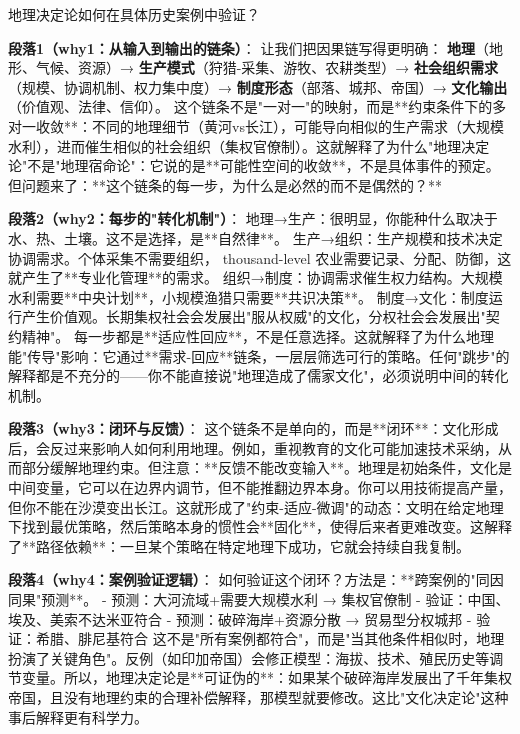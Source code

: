 \documentclass[openany, a4paper, 12pt]{book}
\begin{document}
	\begin{questionbox}
		地理决定论如何在具体历史案例中验证？
	\end{questionbox}
	
	\textbf{段落1（why1：从输入到输出的链条）}：  
	让我们把因果链写得更明确：  
	\textbf{地理}（地形、气候、资源）→ \textbf{生产模式}（狩猎-采集、游牧、农耕类型）→ \textbf{社会组织需求}（规模、协调机制、权力集中度）→ \textbf{制度形态}（部落、城邦、帝国）→ \textbf{文化输出}（价值观、法律、信仰）。  
	这个链条不是"一对一"的映射，而是**约束条件下的多对一收敛**：不同的地理细节（黄河vs长江），可能导向相似的生产需求（大规模水利），进而催生相似的社会组织（集权官僚制）。这就解释了为什么"地理决定论"不是"地理宿命论"：它说的是**可能性空间的收敛**，不是具体事件的预定。但问题来了：**这个链条的每一步，为什么是必然的而不是偶然的？**
	
	\textbf{段落2（why2：每步的"转化机制"）}：  
	地理→生产：很明显，你能种什么取决于水、热、土壤。这不是选择，是**自然律**。  
	生产→组织：生产规模和技术决定协调需求。个体采集不需要组织， thousand-level 农业需要记录、分配、防御，这就产生了**专业化管理**的需求。  
	组织→制度：协调需求催生权力结构。大规模水利需要**中央计划**，小规模渔猎只需要**共识决策**。  
	制度→文化：制度运行产生价值观。长期集权社会会发展出"服从权威"的文化，分权社会会发展出"契约精神"。  
	每一步都是**适应性回应**，不是任意选择。这就解释了为什么地理能"传导"影响：它通过**需求-回应**链条，一层层筛选可行的策略。任何"跳步"的解释都是不充分的——你不能直接说"地理造成了儒家文化"，必须说明中间的转化机制。
	
	\textbf{段落3（why3：闭环与反馈）}：  
	这个链条不是单向的，而是**闭环**：文化形成后，会反过来影响人如何利用地理。例如，重视教育的文化可能加速技术采纳，从而部分缓解地理约束。但注意：**反馈不能改变输入**。地理是初始条件，文化是中间变量，它可以在边界内调节，但不能推翻边界本身。你可以用技術提高产量，但你不能在沙漠变出长江。这就形成了"约束-适应-微调"的动态：文明在给定地理下找到最优策略，然后策略本身的惯性会**固化**，使得后来者更难改变。这解释了**路径依赖**：一旦某个策略在特定地理下成功，它就会持续自我复制。
	
	\textbf{段落4（why4：案例验证逻辑）}：  
	如何验证这个闭环？方法是：**跨案例的"同因同果"预测**。  
	- 预测：大河流域+需要大规模水利 → 集权官僚制  
	- 验证：中国、埃及、美索不达米亚符合  
	- 预测：破碎海岸+资源分散 → 贸易型分权城邦  
	- 验证：希腊、腓尼基符合  
	这不是"所有案例都符合"，而是"当其他条件相似时，地理扮演了关键角色"。反例（如印加帝国）会修正模型：海拔、技术、殖民历史等调节变量。所以，地理决定论是**可证伪的**：如果某个破碎海岸发展出了千年集权帝国，且没有地理约束的合理补偿解释，那模型就要修改。这比"文化决定论"这种事后解释更有科学力。
	
\end{document}

